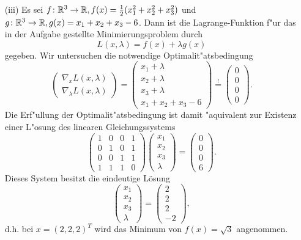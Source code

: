 \begin{itemize}
\item[(iii)] Es sei $f\colon\mathbb{R}^3 \to \mathbb{R}, f(x) =\frac{1}{2} (x_1^2 + x_2^2 + x_3^2)$ und
$g\colon\mathbb{R}^3 \to \mathbb{R}, g(x) = x_1 + x_2 + x_3 - 6$. Dann ist die Lagrange-Funktion
f"ur das in der Aufgabe gestellte Minimierungsproblem durch
\[
L(x, \lambda) = f(x) + \lambda g(x)
\]
gegeben. Wir untersuchen die notwendige Optimalit"atsbedingung
\[
\begin{pmatrix} \nabla_x L(x, \lambda) \\ \nabla_\lambda L(x, \lambda)\end{pmatrix}
= \begin{pmatrix}
x_1+\lambda\\x_2+\lambda\\x_3+\lambda \\ x_1 + x_2 + x_3 - 6 \end{pmatrix}
\overset{!}{=}\begin{pmatrix} 0 \\ 0\\0\\0 \end{pmatrix}.
\]
Die Erf"ullung der Optimalit"atsbedingung
ist damit "aquivalent zur Existenz einer L"osung des linearen Gleichungssystems
\[
\begin{pmatrix} 
1 & 0 & 0 &1 \\ 
0 & 1 & 0 &1 \\
0 & 0 & 1 &1\\
1 & 1 & 1 & 0
\end{pmatrix}\begin{pmatrix} x_1 \\ x_2 \\ x_3 \\\lambda\end{pmatrix}
= \begin{pmatrix} 0\\0\\0 \\ 6 \end{pmatrix}.
\]
Dieses System besitzt die eindeutige Lösung
\[\begin{pmatrix} x_1 \\ x_2 \\ x_3 \\\lambda\end{pmatrix}
=\begin{pmatrix} 2 \\ 2 \\ 2 \\-2\end{pmatrix},
\]
d.h. bei $x=(2,2,2)^T$ wird das Minimum von $f(x)=\sqrt{3}$ angenommen.
\end{itemize}
